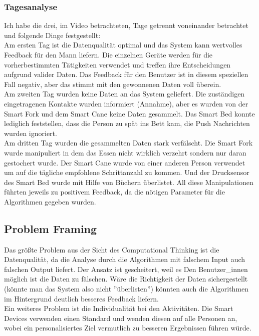 \subsubsection{\textbf{Tagesanalyse}}
Ich habe die drei, im Video\cite{uninvatedGuests} betrachteten, Tage getrennt voneinander betrachtet und folgende Dinge festgestellt: \\
Am ersten Tag ist die Datenqualität optimal und das System kann wertvolles Feedback für den Mann liefern. Die einzelnen Geräte werden für die vorherbestimmten Tätigkeiten verwendet und treffen ihre Entscheidungen aufgrund valider Daten. Das Feedback für den Benutzer ist in diesem speziellen Fall negativ, aber das stimmt mit den gewonnenen Daten voll überein. \\
Am zweiten Tag wurden keine Daten an das System geliefert. Die zuständigen eingetragenen Kontakte wurden informiert (Annahme), aber es wurden von der Smart Fork und dem Smart Cane keine Daten gesammelt. Das Smart Bed konnte lediglich feststellen, dass die Person zu spät ins Bett kam, die Push Nachrichten wurden ignoriert. \\
Am dritten Tag wurden die gesammelten Daten stark verfälscht. Die Smart Fork wurde manipuliert in dem das Essen nicht wirklich verzehrt sondern nur daran gestochert wurde. Der Smart Cane wurde von einer anderen Person verwendet um auf die tägliche empfohlene Schrittanzahl zu kommen. Und der Drucksensor des Smart Bed wurde mit Hilfe von Büchern überlistet. All diese Manipulationen führten jeweils zu positivem Feedback, da die nötigen Parameter für die Algorithmen gegeben wurden.\\

\subsection{Problem Framing}
Das größte Problem aus der Sicht des Computational Thinking\cite{slidesComp} ist die Datenqualität, da die Analyse durch die Algorithmen mit falschem Input auch falschen Output liefert. Der Ansatz ist gescheitert, weil es Den Benutzer\_innen möglich ist die Daten zu fälschen. Wäre die Richtigkeit der Daten sichergestellt (könnte man das System also nicht ''überlisten'') könnten auch die Algorithmen im Hintergrund deutlich besseres Feedback liefern. \\
Ein weiteres Problem ist die Individualität bei den Aktivitäten. Die Smart Devices verwenden einen Standard und wenden diesen auf alle Personen an, wobei ein personalisiertes Ziel vermutlich zu besseren Ergebnissen führen würde. 

